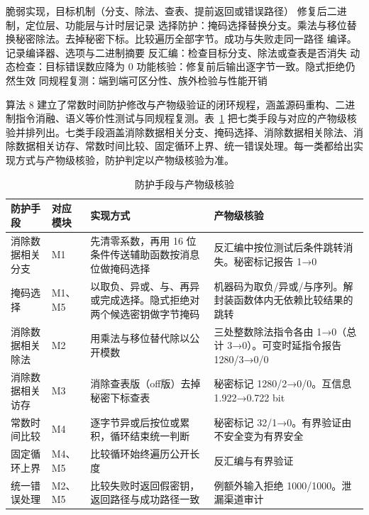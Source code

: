 \begin{algorithm}[H]
\caption{常数时间防护与产物核验}
\label{alg:mitigation}
\begin{algorithmic}[1]
\Require 脆弱实现，目标机制（分支、除法、查表、提前返回或错误路径）
\Ensure 修复后二进制，定位层、功能层与计时层记录
\State 选择防护：掩码选择替换分支。乘法与移位替换秘密除法。去掉秘密下标。比较遍历全部字节。成功与失败走同一路径
\State 编译。记录编译器、选项与二进制摘要
\State 反汇编：检查目标分支、除法或查表是否消失
\State 动态检查：目标错误数应降为 0
\State 功能核验：修复前后输出逐字节一致。隐式拒绝仍然生效
\State 同规程复测：端到端可区分性、族外检验与性能开销
\end{algorithmic}
\end{algorithm}

算法 8 建立了常数时间防护修改与产物级验证的闭环规程，涵盖源码重构、二进制指令消融、语义等价性测试与同规程复测。表~\ref{tab:mitigation} 把七类手段与对应的产物级核验并排列出。七类手段涵盖消除数据相关分支、掩码选择、消除数据相关除法、消除数据相关访存、常数时间比较、固定循环上界、统一错误处理。每一类都给出实现方式与产物级核验，防护判定以产物级核验为准。

\begin{table}[H]
\centering
\caption{防护手段与产物级核验}
\label{tab:mitigation}
{\small
\begin{tabularx}{\textwidth}{|>{\raggedright\arraybackslash}p{3.4cm}|>{\raggedright\arraybackslash}p{1.5cm}|>{\raggedright\arraybackslash}X|>{\raggedright\arraybackslash}X|}
\hline
防护手段 & 对应模块 & 实现方式 & 产物级核验 \\
\hline
消除数据相关分支 & M1 & 先清零系数，再用 16 位条件传送辅助函数按消息位做掩码选择 & 反汇编中按位测试后条件跳转消失。秘密标记报告 1→0 \\
\hline
掩码选择 & M1、M5 & 以取负、异或、与、再异或完成选择。隐式拒绝对两个候选密钥做字节掩码 & 机器码为取负/异或/与序列。解封装函数体内无依赖比较结果的跳转 \\
\hline
消除数据相关除法 & M2 & 用乘法与移位替代除以公开模数 & 三处整数除法指令各由 1→0（总计 3→0）。可变时延指令报告 1280/3→0/0 \\
\hline
消除数据相关访存 & M3 & 消除查表版（off版）去掉秘密下标查表 & 秘密标记 1280/2→0/0。互信息 1.922→0.722 bit \\
\hline
常数时间比较 & M4 & 逐字节异或后按位或累积，循环结束统一判断 & 秘密标记 32/1→0。有界验证由不安全变为有界安全 \\
\hline
固定循环上界 & M4、M5 & 比较循环始终遍历公开长度 & 反汇编与有界验证 \\
\hline
统一错误处理 & M2、M5 & 比较失败时返回假密钥，返回路径与成功路径一致 & 1000 例额外输入拒绝 1000/1000。泄漏渠道审计 \\
\hline
\end{tabularx}
}
\end{table}

